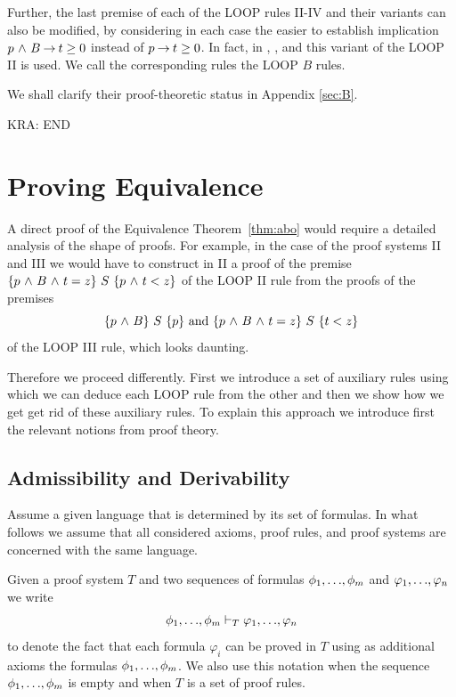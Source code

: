 \documentclass[manuscript, screen, review]{acmart}
\begin{document}
Further, the last premise of each of the LOOP rules II-IV and their
variants can also be modified, by considering in each case the easier
to establish implication $p \mbox{$\ \wedge\ $} B \mbox{$\:\rightarrow\:$} t \geq 0$ instead of
$p \mbox{$\:\rightarrow\:$} t \geq 0$.  In fact, in \cite[page151]{Almeida11}, \cite[page 337]{OG76a}, 
and \cite[page 64]{Rey98} this variant of the LOOP II is used. We call the
corresponding rules the LOOP $B$ rules.

We shall clarify their proof-theoretic status in Appendix \ref{sec:B}.

KRA: END 



\section{Proving Equivalence}
\label{sec:proving-equiv}

A direct proof of the Equivalence Theorem~\ref{thm:abo} would require a detailed
analysis of the shape of proofs. For example, in the case of the proof
systems II and III we would have to construct in II a proof of the premise
$ \mbox{$\{{p \mbox{$\ \wedge\ $} B \mbox{$\ \wedge\ $} t=z}\}\ {S}\ \{{p \mbox{$\ \wedge\ $} t<z}\}$}$ of the LOOP II rule from the proofs
of the premises 
\[
 \mbox{$\{{p \mbox{$\ \wedge\ $} B}\}\ {S}\ \{{p}\}$} \mbox{ and } \mbox{$\{{p \mbox{$\ \wedge\ $} B \mbox{$\ \wedge\ $} t=z}\}\ {S}\ \{{t<z}\}$}
\]
of the LOOP III rule, which looks daunting.

Therefore we proceed differently. First we introduce a set of
auxiliary rules using which we can deduce each LOOP rule from the
other and then we show how we get get rid of these auxiliary rules.
To explain this approach we introduce first the relevant notions from
proof theory.


\subsection{Admissibility and Derivability}

Assume a given language that is determined by its set of formulas.  In
what follows we assume that all considered axioms, proof rules, and
proof systems are concerned with the same language.

Given a proof system $T$ and two sequences of formulas
$\phi_1, \mbox{$\ldots$}, \phi_m$ and $\varphi_1, \mbox{$\ldots$}, \varphi_n$ we write
\[
  \phi_1, \mbox{$\ldots$}, \phi_m \vdash_T \varphi_1, \mbox{$\ldots$}, \varphi_n
\]
to denote the fact that each formula $\varphi_i$ can be proved in
$T$ using as additional axioms the formulas
$\phi_1, \mbox{$\ldots$}, \phi_m$.  We also use this notation when the sequence
$\phi_1, \mbox{$\ldots$}, \phi_m$ is empty and when $T$ is a set of proof
rules.
\end{document}
